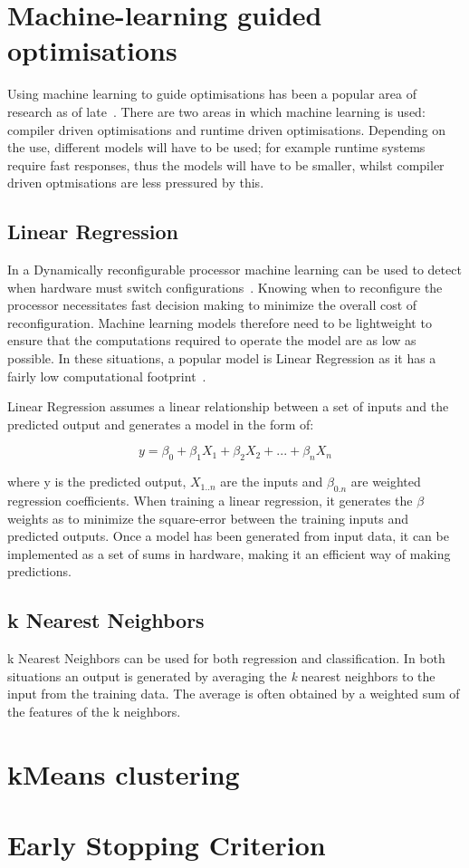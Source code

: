 \section{Machine-learning guided optimisations}

Using machine learning to guide optimisations has been a popular area of research as of late~\cite{cummins2017pact,wang2018ml,dubach13dynamic}.
There are two areas in which machine learning is used: compiler driven optimisations and runtime driven optimisations.
Depending on the use, different models will have to be used; for example runtime systems require fast responses, thus the models will have to be smaller, whilst compiler driven optmisations are less pressured by this.

\subsection{Linear Regression}

In a Dynamically reconfigurable processor machine learning can be used to detect when hardware must switch configurations~\cite{micolet2017cases, tavanaElastic}.
Knowing when to reconfigure the processor necessitates fast decision making to minimize the overall cost of reconfiguration.
Machine learning models therefore need to be lightweight to ensure that the computations required to operate the model are as low as possible.
In these situations, a popular model is Linear Regression as it has a fairly low computational footprint~\cite{tavanaElastic}.

Linear Regression assumes a linear relationship between a set of inputs and the predicted output and generates a model in the form of:

\begin{equation}
y = \beta_0 + \beta_1X_1 + \beta_2X_2 + ... + \beta_nX_n
\end{equation}

where y is the predicted output, $X_{1..n}$ are the inputs and $\beta_{0.n}$ are weighted regression coefficients.
When training a linear regression, it generates the $\beta$ weights as to minimize the square-error between the training inputs and predicted outputs.
Once a model has been generated from input data, it can be implemented as a set of sums in hardware, making it an efficient way of making predictions.

\subsection{k Nearest Neighbors}

k Nearest Neighbors can be used for both regression and classification.
In both situations an output is generated by averaging the \textit{k} nearest neighbors to the input from the training data.
The average is often obtained by a weighted sum of the features of the k neighbors.

\section{kMeans clustering}
\section{Early Stopping Criterion}